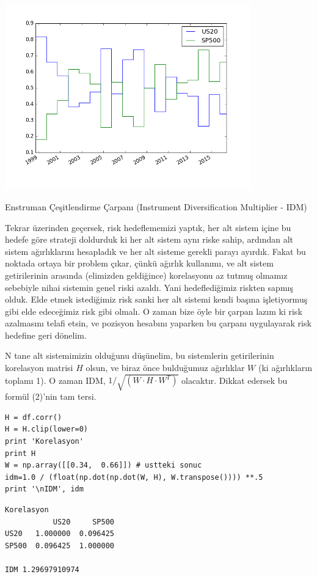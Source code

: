 \documentclass[12pt,fleqn]{article}\usepackage{../../common}
\begin{document}
\includegraphics[height=8cm]{tser_voltar_01.png}

Enstruman Çeşitlendirme Çarpanı (Instrument Diversification Multiplier - IDM)

Tekrar üzerinden geçersek, risk hedeflememizi yaptık, her alt sistem içine bu
hedefe göre strateji doldurduk ki her alt sistem aynı riske sahip, ardından alt
sistem ağırlıklarını hesapladık ve her alt sisteme gerekli parayı ayırdık. Fakat
bu noktada ortaya bir problem çıkar, çünkü ağırlık kullanımı, ve alt sistem
getirilerinin arasında (elimizden geldiğince) korelasyonu az tutmuş olmamız
sebebiyle nihai sistemin genel riski azaldı. Yani hedeflediğimiz riskten sapmış
olduk. Elde etmek istediğimiz risk sanki her alt sistemi kendi başına
işletiyormuş gibi elde edeceğimiz risk gibi olmalı. O zaman bize öyle bir çarpan
lazım ki risk azalmasını telafi etsin, ve pozisyon hesabını yaparken bu çarpanı
uygulayarak risk hedefine geri dönelim.

N tane alt sistemimizin olduğunu düşünelim, bu sistemlerin getirilerinin
korelasyon matrisi $H$ olsun, ve biraz önce bulduğumuz ağırlıklar $W$ (ki
ağırlıkların toplamı 1). O zaman IDM, $1 / \sqrt{(W \cdot H \cdot W^T)}$
olacaktır. Dikkat edersek bu formül (2)'nin tam tersi. 

\begin{verbatim}
H = df.corr()
H = H.clip(lower=0)
print 'Korelasyon'
print H
W = np.array([[0.34,  0.66]]) # ustteki sonuc
idm=1.0 / (float(np.dot(np.dot(W, H), W.transpose()))) **.5
print '\nIDM', idm
\end{verbatim}

\begin{verbatim}
Korelasyon
           US20     SP500
US20   1.000000  0.096425
SP500  0.096425  1.000000

IDM 1.29697910974
\end{verbatim}
\end{document}
